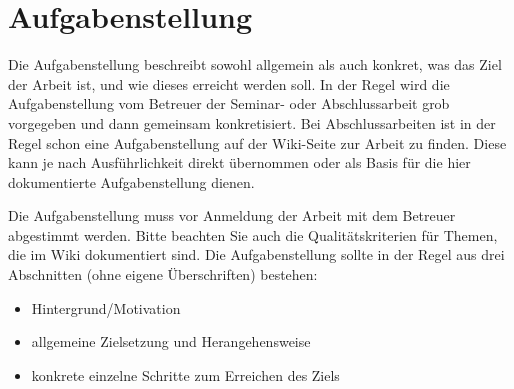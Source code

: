 \section*{Aufgabenstellung}\label{sec:Aufgabenstellung}

Die Aufgabenstellung beschreibt sowohl allgemein als auch konkret, was das Ziel der Arbeit ist, und wie dieses erreicht werden soll. 
In der Regel wird die Aufgabenstellung vom Betreuer der Seminar- oder Abschlussarbeit grob vorgegeben und dann gemeinsam konkretisiert. Bei Abschlussarbeiten ist in der Regel schon eine Aufgabenstellung auf der Wiki-Seite zur Arbeit zu finden. Diese kann je nach Ausführlichkeit direkt übernommen oder als Basis für die hier dokumentierte Aufgabenstellung dienen. 

Die Aufgabenstellung muss vor Anmeldung der Arbeit mit dem Betreuer abgestimmt werden. Bitte beachten Sie auch die Qualitätskriterien für Themen, die im Wiki dokumentiert sind.
Die Aufgabenstellung sollte in der Regel aus drei Abschnitten (ohne eigene Überschriften) bestehen: 

\begin{itemize}
    \item{Hintergrund/Motivation}
    \item{allgemeine Zielsetzung und Herangehensweise}
    \item{konkrete einzelne Schritte zum Erreichen des Ziels}
\end{itemize}
